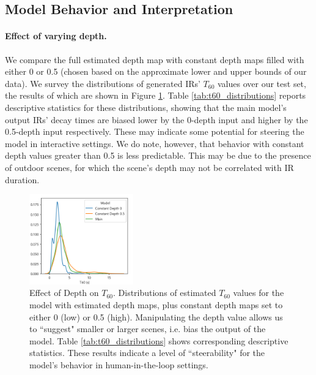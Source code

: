 \documentclass[10pt,twocolumn,letterpaper]{article}
\begin{document}
\subsection{Model Behavior and Interpretation}

\paragraph{Effect of varying depth.}
We compare the full estimated depth map with constant depth maps filled with either 0 or 0.5 (chosen based on the approximate lower and upper bounds of our data). We survey the distributions of generated IRs' $T_{60}$ values over our test set, the results of which are shown in Figure \ref{fig:t60_distributions}. Table \ref{tab:t60_distributions} reports descriptive statistics for these distributions, showing that the main model's output IRs' decay times are biased lower by the 0-depth input and higher by the 0.5-depth input respectively. These may indicate some potential for steering the model in interactive settings. We do note, however, that behavior with constant depth values greater than 0.5 is less predictable. This may be due to the presence of outdoor scenes, for which the scene's depth may not be correlated with IR duration. 

\begin{figure}
    \centering
    \includegraphics[width=0.4\textwidth]{t60_kde.png}
    \caption{Effect of Depth on $T_{60}$. Distributions of estimated $T_{60}$ values for the model with estimated depth maps, plus constant depth maps set to either 0 (low) or 0.5 (high). Manipulating the depth value allows us to ``suggest" smaller or larger scenes, i.e. bias the output of the model. Table \ref{tab:t60_distributions} shows corresponding descriptive statistics. These results indicate a level of ``steerability" for the model's behavior in human-in-the-loop settings.}
    \label{fig:t60_distributions}
\end{figure}
\end{document}
